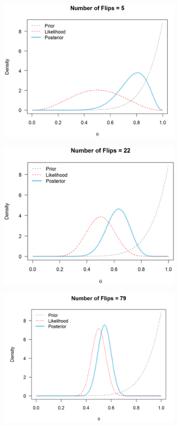 \begin{figure}[h]
	\begin{subfigure}{.5\textwidth}
	\centering
	\includegraphics[width=.8\linewidth]{Chuong3/Figs/5.png}
	\label{fig:sfig1}
	\end{subfigure}
	\begin{subfigure}{.5\textwidth}
	\centering
	\includegraphics[width=.8\linewidth]{Chuong3/Figs/22.png}
	\label{fig:sfig1}
	\end{subfigure}
	\begin{subfigure}{.5\textwidth}
	\centering
	\includegraphics[width=.8\linewidth]{Chuong3/Figs/79.png}

\end{subfigure}
\end{figure}
